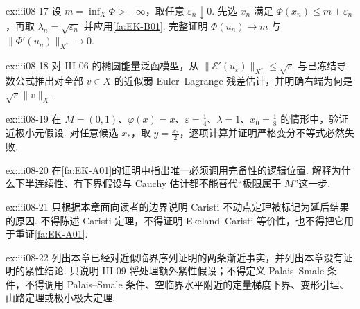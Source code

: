 \begin{FAExercise}[近似临界序列]{ex:iii08-17}
设 \(\displaystyle m=\inf_X\Phi> -\infty\)，取任意 \(\displaystyle\varepsilon_n\downarrow0\). 先选 \(\displaystyle x_n\) 满足 \(\displaystyle\Phi(x_n)\leqslant m+\varepsilon_n\)，再取 \(\displaystyle\lambda_n=\sqrt{\varepsilon_n}\) 并应用\autoref{fa:EK-B01}. 完整证明 \(\displaystyle\Phi(u_n)\to m\) 与 \(\displaystyle\|\Phi'(u_n)\|_{X^*}\to0\).
\end{FAExercise}

\begin{FAExercise}[能量残差估计]{ex:iii08-18}
对 III-06 的椭圆能量泛函模型，从 \(\displaystyle\|\mathcal E'(u_\varepsilon)\|_{X^*}\leqslant\sqrt{\varepsilon}\) 与已冻结导数公式推出对全部 \(\displaystyle v\in X\) 的近似弱 Euler--Lagrange 残差估计，并明确右端为何是 \(\displaystyle\sqrt{\varepsilon}\|v\|_X\).
\end{FAExercise}

\begin{FAExercise}[不完备空间反例]{ex:iii08-19}
在 \(\displaystyle M=(0,1)\)、\(\displaystyle\varphi(x)=x\)、\(\displaystyle\varepsilon=\frac{1}{4}\)、\(\displaystyle\lambda=1\)、\(\displaystyle x_0=\frac{1}{8}\) 的情形中，验证近极小元假设. 对任意候选 \(\displaystyle x_*\)，取 \(\displaystyle y=\frac{x_*}{2}\)，逐项计算并证明严格变分不等式必然失败.
\end{FAExercise}

\begin{FAExercise}[完备性的证明位置]{ex:iii08-20}
在\autoref{fa:EK-A01}的证明中指出唯一必须调用完备性的逻辑位置. 解释为什么下半连续性、有下界假设与 Cauchy 估计都不能替代“极限属于 \(\displaystyle M\)”这一步.
\end{FAExercise}

\begin{FAExercise}{ex:iii08-21}
只根据本章面向读者的边界说明 Caristi 不动点定理被标记为延后结果的原因. 不得陈述 Caristi 定理，不得证明 Ekeland--Caristi 等价性，也不得把它用于重证\autoref{fa:EK-A01}.
\end{FAExercise}

\begin{FAExercise}{ex:iii08-22}
列出本章已经对近似临界序列证明的两条渐近事实，并列出本章没有证明的紧性结论. 只说明 III-09 将处理额外紧性假设；不得定义 Palais--Smale 条件，不得调用 Palais--Smale 条件、空临界水平附近的定量梯度下界、变形引理、山路定理或极小极大定理.
\end{FAExercise}
